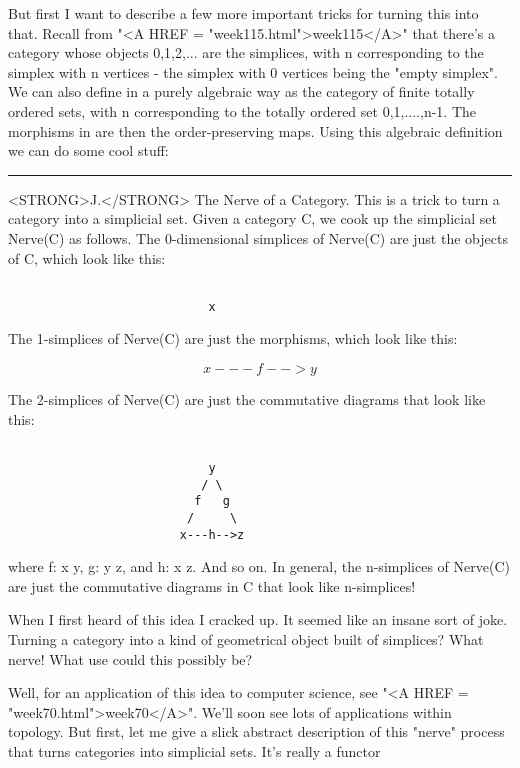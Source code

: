But first I want to describe a few more important tricks for turning
this into that.  Recall from "<A HREF =
"week115.html">week115</A>" that there's a category \Delta  whose
objects 0,1,2,... are the simplices, with n corresponding to the
simplex with n vertices - the simplex with 0 vertices being the
"empty simplex".  We can also define \Delta  in a purely
algebraic way as the category of finite totally ordered sets, with n
corresponding to the totally ordered set {0,1,....,n-1}.  The
morphisms in \Delta  are then the order-preserving maps.  Using this
algebraic definition we can do some cool stuff:

\par\noindent\rule{\textwidth}{0.4pt}
<STRONG>J.</STRONG>  The Nerve of a Category.  This is a trick to turn a category into a
simplicial set.  Given a category C, we cook up the simplicial set
Nerve(C) as follows.  The 0-dimensional simplices of Nerve(C) are just
the objects of C, which look like this:


\begin{verbatim}

                            x
\end{verbatim}
    
The 1-simplices of Nerve(C) are just the morphisms, which look like
this:


$$

                        x---f-->y
$$
    
The 2-simplices of Nerve(C) are just the commutative diagrams that
look like this:


\begin{verbatim}

                            y
                           / \                 
                          f   g
                         /     \
                        x---h-->z 
\end{verbatim}
    
where f: x \to  y, g: y \to  z, and h: x \to  z.  And so on.  In general,
the n-simplices of Nerve(C) are just the commutative diagrams in 
C that look like n-simplices!  

When I first heard of this idea I cracked up.  It seemed like an insane
sort of joke.  Turning a category into a kind of geometrical object
built of simplices?  What nerve!  What use could this possibly be?  

Well, for an application of this idea to computer science, see "<A HREF = "week70.html">week70</A>".
We'll soon see lots of applications within topology.  But first, let me
give a slick abstract description of this "nerve" process that turns
categories into simplicial sets.  It's really a functor

